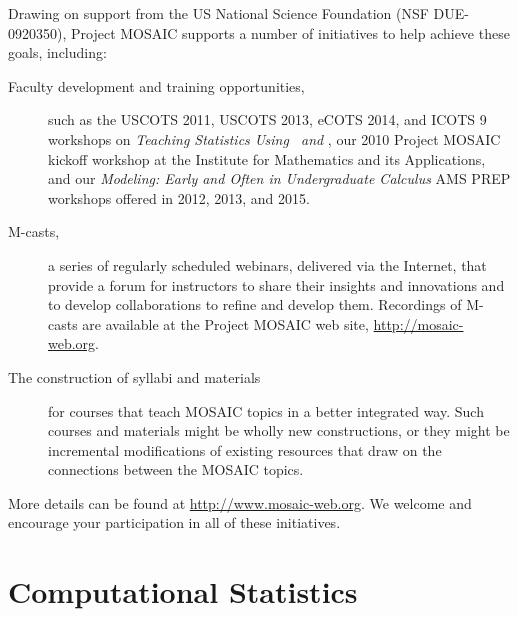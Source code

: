 \documentclass{tufte-book}\usepackage[]{graphicx}\usepackage[]{xcolor}
\begin{document}
Drawing on support from the US National Science Foundation (NSF DUE-0920350),
Project MOSAIC supports a number of initiatives to help achieve these goals,
including:
\begin{description}
\item
[Faculty development and training opportunities,] 
such as the USCOTS 2011, USCOTS 2013, eCOTS 2014, and ICOTS 9 workshops on 
\emph{Teaching Statistics Using \R\ and \RStudio}, our 2010 
Project MOSAIC kickoff workshop at the Institute for Mathematics
and its Applications, and our \emph{Modeling: Early and Often in Undergraduate Calculus}
AMS PREP workshops offered in 2012,  2013, and 2015.

\item
[M-casts,] 
a series of regularly scheduled webinars, delivered via the Internet, 
that provide a forum for instructors to share their insights and innovations 
and to develop collaborations to refine and develop them.
Recordings of M-casts are available
at the Project MOSAIC web site, \url{http://mosaic-web.org}.


\item[The construction of syllabi and materials] 
for courses that teach MOSAIC topics in a better integrated way. Such
courses and materials might be wholly new constructions, or they might be 
incremental modifications of existing resources that draw on the 
connections between the MOSAIC topics.
\end{description}

More details can be found at \url{http://www.mosaic-web.org}.
We welcome and encourage your participation in all of these initiatives.  



\chapter*{Computational Statistics}
\end{document}
